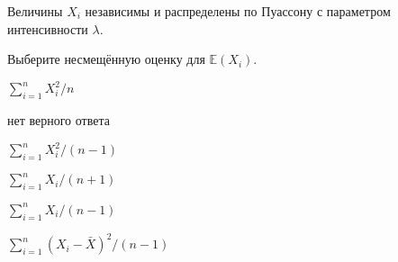 
\begin{question}
Величины \(X_i\) независимы и распределены по Пуассону с параметром
интенсивности \(\lambda\).

Выберите несмещённую оценку для \(\mathbb{E}(X_i)\).
\begin{answerlist}
  \item \(\sum_{i=1}^n X_i^2 / n\)
  \item нет верного ответа
  \item \(\sum_{i=1}^n X_i^2 / (n - 1)\)
  \item \(\sum_{i=1}^n X_i / (n + 1)\)
  \item \(\sum_{i=1}^n X_i / (n - 1)\)
  \item \(\sum_{i=1}^n (X_i - \bar X)^2 / (n - 1)\)
\end{answerlist}
\end{question}


